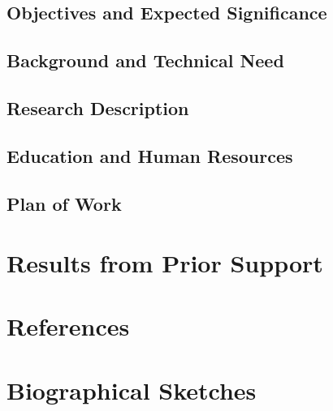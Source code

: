 \documentclass{article}
\begin{document}
\subsection{Objectives and Expected Significance}
\subsection{Background and Technical Need}
\subsection{Research Description}
\subsection{Education and Human Resources}
\subsection{Plan of Work}

\section{Results from Prior Support}
\section{References}
\section{Biographical Sketches}
\end{document}
